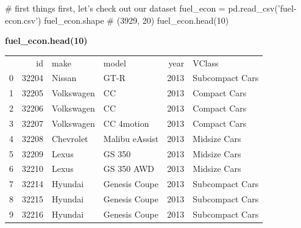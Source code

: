 \begin{python}
	# first things first, let's check out our dataset
	fuel_econ = pd.read_csv('fuel-econ.csv')
	fuel_econ.shape
	# (3929, 20)
	fuel_econ.head(10)
\end{python}

\begin{center}
\textbf{fuel\_econ.head(10)}
\end{center}
	\begin{tabular}{lrllrl}
		{} &     id &        make &           model &  year &           VClass \\
		0 &  32204 &      Nissan &            GT-R &  2013 &  Subcompact Cars \\
		1 &  32205 &  Volkswagen &              CC &  2013 &     Compact Cars \\
		2 &  32206 &  Volkswagen &              CC &  2013 &     Compact Cars \\
		3 &  32207 &  Volkswagen &      CC 4motion &  2013 &     Compact Cars \\
		4 &  32208 &   Chevrolet &  Malibu eAssist &  2013 &     Midsize Cars \\
		5 &  32209 &       Lexus &          GS 350 &  2013 &     Midsize Cars \\
		6 &  32210 &       Lexus &      GS 350 AWD &  2013 &     Midsize Cars \\
		7 &  32214 &     Hyundai &   Genesis Coupe &  2013 &  Subcompact Cars \\
		8 &  32215 &     Hyundai &   Genesis Coupe &  2013 &  Subcompact Cars \\
		9 &  32216 &     Hyundai &   Genesis Coupe &  2013 &  Subcompact Cars \\
	\end{tabular}
	

